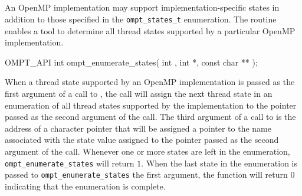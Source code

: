  \subsection{}
 \label{ompt_enumerate_states}
 \summary
 
An OpenMP implementation may support implementation-specific states in 
addition to those specified in the \verb|ompt_states_t| enumeration.
The  routine enables a tool 
to determine all thread states supported by a particular OpenMP 
implementation.

\format

\ccppspecificstart
\begin{boxedcode}
OMPT_API int ompt_enumerate_states(
  int , 
  int *, 
  const char **
);
\end{boxedcode}
\ccppspecificend

\effect

When a thread state supported by an OpenMP implementation is passed
as the first argument of  
a call to , the call will 
assign the next thread state in an enumeration of all thread states
supported by the implementation to the pointer passed as the second
argument of the call.
The third argument of a call to 
is the address of a character pointer
that will be assigned a pointer to the name associated with 
the state value assigned to the pointer passed as the second argument of 
the call.
Whenever one or more states are left in the enumeration, 
\verb|ompt_enumerate_states| will return $1$.
When the last state in the enumeration is passed 
to \verb|ompt_enumerate_states| the first argument, 
the function will return $0$ 
indicating that the enumeration is complete.


\begin{comment}
For instance, a particular OpenMP implementation may want to 
provide more detail about the nature of runtime overhead, 
e.g., to differentiate between overhead associated with setting up 
parallel regions
and overhead associated with setting up tasks. 
To enable a tool to identify all states that an OpenMP implementation
supports, the following interface for enumerating all states that may be reported by the runtime that is being used.
\end{comment}

